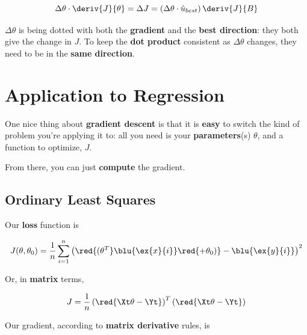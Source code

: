         \begin{equation}
            \Delta \theta \cdot \deriv{J}{\theta} 
            = \Delta J = 
            \left( 
                \Delta \theta \cdot \hat{u}_{best} 
            \right) 
            \deriv{J}{B}
        \end{equation}
        
        $\Delta \theta$ is being dotted with both the \textbf{gradient} and the \textbf{best direction}: they both give the change in $J$. To keep the \textbf{dot product} consistent as $\Delta \theta$ changes, they need to be in the \textbf{same direction}.

\pagebreak
\section{Application to Regression}
    
    One nice thing about \textbf{gradient descent} is that it is \textbf{easy} to switch the kind of problem you're applying it to: all you need is your \textbf{parameters}(s) $\theta$, and a function to optimize, $J$.
    
    From there, you can just \textbf{compute} the gradient.

    \subsection{Ordinary Least Squares}
        
        Our \textbf{loss} function is
        
        \begin{equation}
            J(\theta,\theta_0) = 
            \frac{1}{n}  \sum_{i=1}^n 
            \left( \red{ (\theta^T} \blu{\ex{x}{i}} \red{ + \theta_0) } 
            - \blu{\ex{y}{i}} \right)^2 
        \end{equation}
            
        Or, in \textbf{matrix} terms,
        
        \begin{equation*}
            J = \frac{1}{n}
                \left( \red{ \Xt \theta  - \Yt } \right)^T
                \left( \red{ \Xt \theta  - \Yt } \right) 
        \end{equation*}
        
        Our gradient, according to \textbf{matrix derivative} rules, is
        
